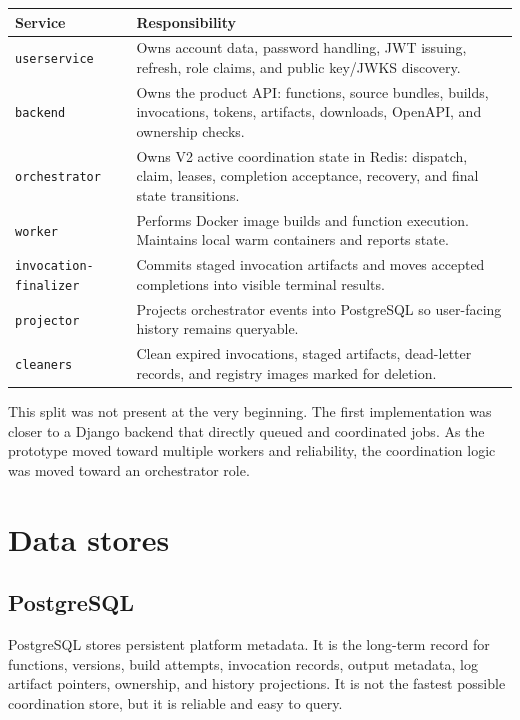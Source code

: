 \documentclass[12pt,a4paper]{report}
\newcommand{\service}[1]{\texttt{#1}}
\begin{document}
\begin{longtable}{p{}p{}}
\toprule
\textbf{Service} & \textbf{Responsibility} \\
\midrule
\service{userservice} & Owns account data, password handling, JWT issuing, refresh, role claims, and public key/JWKS discovery. \\
\service{backend} & Owns the product API: functions, source bundles, builds, invocations, tokens, artifacts, downloads, OpenAPI, and ownership checks. \\
\service{orchestrator} & Owns V2 active coordination state in Redis: dispatch, claim, leases, completion acceptance, recovery, and final state transitions. \\
\service{worker} & Performs Docker image builds and function execution. Maintains local warm containers and reports state. \\
\service{invocation-finalizer} & Commits staged invocation artifacts and moves accepted completions into visible terminal results. \\
\service{projector} & Projects orchestrator events into PostgreSQL so user-facing history remains queryable. \\
\service{cleaners} & Clean expired invocations, staged artifacts, dead-letter records, and registry images marked for deletion. \\
\bottomrule
\end{longtable}

This split was not present at the very beginning. The first implementation was
closer to a Django backend that directly queued and coordinated jobs. As the
prototype moved toward multiple workers and reliability, the coordination logic
was moved toward an orchestrator role.

\section{Data stores}

\subsection{PostgreSQL}

PostgreSQL stores persistent platform metadata. It is the long-term record for
functions, versions, build attempts, invocation records, output metadata, log
artifact pointers, ownership, and history projections. It is not the fastest
possible coordination store, but it is reliable and easy to query.
\end{document}
